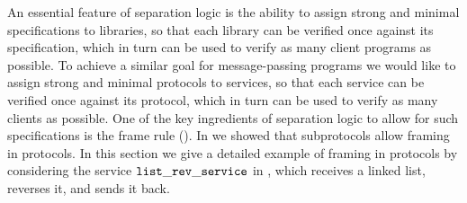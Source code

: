 \listrevfig

An essential feature of separation logic is the ability to assign strong and
minimal specifications to libraries, so that each library can be verified once
against its specification, which in turn can be used to verify as many client
programs as possible.
To achieve a similar goal for message-passing programs we would like to
assign strong and minimal protocols to services,
so that each service can be verified once against its protocol, which in turn can be
used to verify as many clients as possible.
One of the key ingredients of separation logic to allow for such specifications is
the frame rule ().
In  we showed that subprotocols allow
framing in protocols.
In this section we give a detailed example of framing in protocols by considering the
service $\mathtt{list\_rev}\_{\mathtt{service}}$ in ,
which receives a linked list, reverses it, and sends it back.

